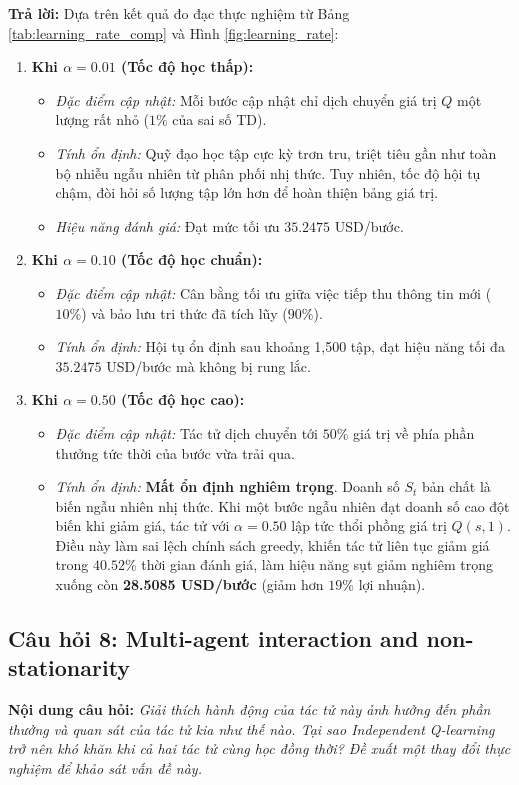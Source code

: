 \documentclass[12pt,a4paper]{article}
\begin{document}
\textbf{Trả lời:}
Dựa trên kết quả đo đạc thực nghiệm từ Bảng \ref{tab:learning_rate_comp} và Hình \ref{fig:learning_rate}:
\begin{enumerate}
    \item \textbf{Khi $\alpha = 0.01$ (Tốc độ học thấp):}
    \begin{itemize}
        \item \textit{Đặc điểm cập nhật:} Mỗi bước cập nhật chỉ dịch chuyển giá trị $Q$ một lượng rất nhỏ ($1\%$ của sai số TD).
        \item \textit{Tính ổn định:} Quỹ đạo học tập cực kỳ trơn tru, triệt tiêu gần như toàn bộ nhiễu ngẫu nhiên từ phân phối nhị thức. Tuy nhiên, tốc độ hội tụ chậm, đòi hỏi số lượng tập lớn hơn để hoàn thiện bảng giá trị.
        \item \textit{Hiệu năng đánh giá:} Đạt mức tối ưu $35.2475$ USD/bước.
    \end{itemize}
    \item \textbf{Khi $\alpha = 0.10$ (Tốc độ học chuẩn):}
    \begin{itemize}
        \item \textit{Đặc điểm cập nhật:} Cân bằng tối ưu giữa việc tiếp thu thông tin mới ($10\%$) và bảo lưu tri thức đã tích lũy ($90\%$).
        \item \textit{Tính ổn định:} Hội tụ ổn định sau khoảng 1,500 tập, đạt hiệu năng tối đa $35.2475$ USD/bước mà không bị rung lắc.
    \end{itemize}
    \item \textbf{Khi $\alpha = 0.50$ (Tốc độ học cao):}
    \begin{itemize}
        \item \textit{Đặc điểm cập nhật:} Tác tử dịch chuyển tới $50\%$ giá trị về phía phần thưởng tức thời của bước vừa trải qua.
        \item \textit{Tính ổn định:} \textbf{Mất ổn định nghiêm trọng}. Doanh số $S_t$ bản chất là biến ngẫu nhiên nhị thức. Khi một bước ngẫu nhiên đạt doanh số cao đột biến khi giảm giá, tác tử với $\alpha=0.50$ lập tức thổi phồng giá trị $Q(s, 1)$. Điều này làm sai lệch chính sách greedy, khiến tác tử liên tục giảm giá trong $40.52\%$ thời gian đánh giá, làm hiệu năng sụt giảm nghiêm trọng xuống còn \textbf{28.5085 USD/bước} (giảm hơn $19\%$ lợi nhuận).
    \end{itemize}
\end{enumerate}

\subsection{Câu hỏi 8: Multi-agent interaction and non-stationarity}
\textbf{Nội dung câu hỏi:} \textit{Giải thích hành động của tác tử này ảnh hưởng đến phần thưởng và quan sát của tác tử kia như thế nào. Tại sao Independent Q-learning trở nên khó khăn khi cả hai tác tử cùng học đồng thời? Đề xuất một thay đổi thực nghiệm để khảo sát vấn đề này.}
\end{document}
